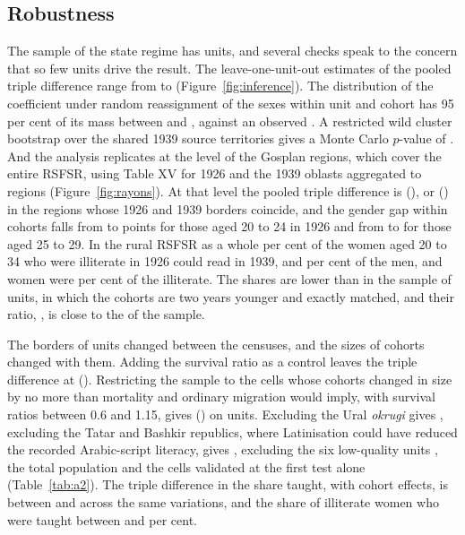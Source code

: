 \FloatBarrier
\subsection{Robustness}\label{sec:robust2}

The sample of the state regime has  units, and several checks speak to the concern that so few units drive the result. The leave-one-unit-out estimates of the pooled triple difference range from  to  (Figure~\ref{fig:inference}). The distribution of the coefficient under random reassignment of the sexes within unit and cohort has 95 per cent of its mass between  and , against an observed . A restricted wild cluster bootstrap over the shared 1939 source territories gives a Monte Carlo $p$-value of . And the analysis replicates at the level of the  Gosplan regions, which cover the entire RSFSR, using Table XV for 1926 and the 1939 oblasts aggregated to regions (Figure~\ref{fig:rayons}). At that level the pooled triple difference is  (), or  () in the  regions whose 1926 and 1939 borders coincide, and the gender gap within cohorts falls from  to  points for those aged 20 to 24 in 1926 and from  to  for those aged 25 to 29. In the rural RSFSR as a whole  per cent of the women aged 20 to 34 who were illiterate in 1926 could read in 1939, and  per cent of the men, and women were  per cent of the illiterate. The shares are lower than in the sample of units, in which the cohorts are two years younger and exactly matched, and their ratio, , is close to the  of the sample.

The borders of units changed between the censuses, and the sizes of cohorts changed with them. Adding the survival ratio as a control leaves the triple difference at  (). Restricting the sample to the cells whose cohorts changed in size by no more than mortality and ordinary migration would imply, with survival ratios between 0.6 and 1.15, gives  () on  units. Excluding the Ural \emph{okrugi} gives , excluding the Tatar and Bashkir republics, where Latinisation could have reduced the recorded Arabic-script literacy, gives , excluding the six low-quality units , the total population  and the cells validated at the first test alone  (Table~\ref{tab:a2}). The triple difference in the share taught, with cohort effects, is between  and  across the same variations, and the share of illiterate women who were taught between  and  per cent.

